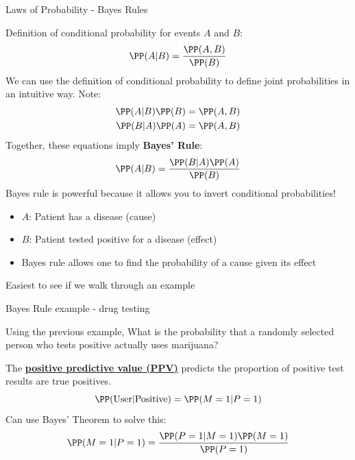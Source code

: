 \documentclass[compress, 8pt]{beamer}
\begin{document}
\begin{frame}{Laws of Probability - Bayes Rules}

Definition of conditional probability for events $A$ and $B$:
\begin{equation*}
    \PP (A \vert B) = \frac{\PP (A, B)}{\PP (B)}
\end{equation*}
We can use the definition of conditional probability to define joint probabilities in an intuitive way. Note:
\begin{align*}
    \PP(A \vert B) \PP(B) &= \PP (A, B) \\
    \PP(B \vert A) \PP(A) &= \PP (A, B) \\
\end{align*}
Together, these equations imply \textbf{Bayes' Rule}:
\begin{equation*}
    \PP (A \vert B) = \frac{\PP (B \vert A) \PP(A)}{\PP(B)}
\end{equation*}
Bayes rule is powerful because it allows you to invert conditional probabilities!
\begin{itemize}
    \item $A$: Patient has a disease (cause)
    \item $B$: Patient tested positive for a disease (effect)
    \item Bayes rule allows one to find the probability of a cause given its effect
\end{itemize}
Easiest to see if we walk through an example



\end{frame}

\begin{frame}{Bayes Rule example - drug testing}


Using the previous example, What is the probability that a randomly selected person who tests positive actually uses marijuana?

\vspace{3ex}
The \href{https://en.wikipedia.org/wiki/Positive_and_negative_predictive_values}{\textbf{positive predictive value (PPV)}} predicts the proportion of positive test results are true positives.
\begin{equation*}
    \PP (\text{User} \vert \text{Positive}) = \PP (M = 1 \vert P = 1)
\end{equation*}
Can use Bayes' Theorem to solve this:
\begin{align*}
    \PP (M = 1 \vert P = 1) &= \frac{\PP  (P = 1 \vert M = 1) \PP (M = 1)}{\PP (P = 1)} \\
\end{align*}



\end{frame}
\end{document}
